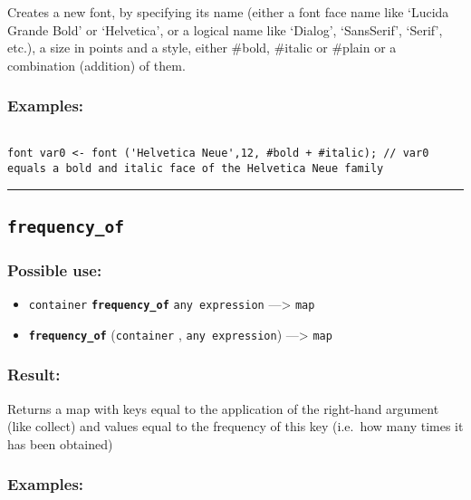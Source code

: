 \documentclass[]{book}
\providecommand{\tightlist}{%
  \setlength{\itemsep}{0pt}\setlength{\parskip}{0pt}}
\theoremstyle{definition}
\theoremstyle{definition}
\theoremstyle{definition}
\theoremstyle{remark}
\begin{document}
Creates a new font, by specifying its name (either a font face name like
`Lucida Grande Bold' or `Helvetica', or a logical name like `Dialog',
`SansSerif', `Serif', etc.), a size in points and a style, either
\#bold, \#italic or \#plain or a combination (addition) of them.

\subsubsection{Examples:}\label{examples-128}

\begin{verbatim}
 
font var0 <- font ('Helvetica Neue',12, #bold + #italic); // var0 equals a bold and italic face of the Helvetica Neue family
\end{verbatim}

\begin{center}\rule{0.5\linewidth}{\linethickness}\end{center}

\subsection{\texorpdfstring{\texttt{frequency\_of}}{frequency\_of}}\label{frequency_of}

\subsubsection{Possible use:}\label{possible-use-174}

\begin{itemize}
\tightlist
\item
  \texttt{container} \textbf{\texttt{frequency\_of}}
  \texttt{any\ expression} ---\textgreater{} \texttt{map}
\item
  \textbf{\texttt{frequency\_of}} (\texttt{container} ,
  \texttt{any\ expression}) ---\textgreater{} \texttt{map}
\end{itemize}

\subsubsection{Result:}\label{result-168}

Returns a map with keys equal to the application of the right-hand
argument (like collect) and values equal to the frequency of this key
(i.e.~how many times it has been obtained)

\subsubsection{Examples:}\label{examples-129}
\end{document}
